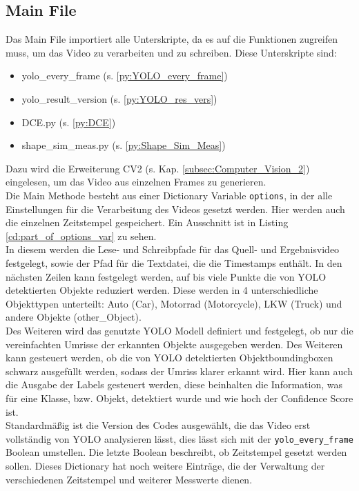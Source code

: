 \subsection{Main File}
{ 
	Das Main File importiert alle Unterskripte, da es auf die Funktionen zugreifen muss, um das Video zu verarbeiten und zu schreiben. Diese Unterskripte sind: 
	\begin{itemize}
		\item yolo\_every\_frame (s. \ref{py:YOLO_every_frame})
		\item yolo\_result\_version (s. \ref{py:YOLO_res_vers})
		\item DCE.py (s. \ref{py:DCE})
		\item shape\_sim\_meas.py (s. \ref{py:Shape_Sim_Meas})
	\end{itemize}
	Dazu wird die Erweiterung CV2 (s. Kap. \ref{subsec:Computer_Vision_2}) eingelesen, um das Video aus einzelnen Frames zu generieren.\\
	Die Main Methode besteht aus einer Dictionary Variable \lstinline|options|, in der alle Einstellungen für die Verarbeitung des Videos gesetzt werden. Hier werden auch die einzelnen Zeitstempel gespeichert. \ifimportant Ein Ausschnitt ist in Listing \ref{cd:part_of_options_var} zu sehen. \fi \\
	In diesem werden die Lese- und Schreibpfade für das Quell- und Ergebnisvideo festgelegt, sowie der Pfad für die Textdatei, die die Timestamps enthält. In den nächsten Zeilen kann festgelegt werden, auf bis viele Punkte die von YOLO detektierten Objekte reduziert werden. Diese werden in 4 unterschiedliche Objekttypen unterteilt: Auto (Car), Motorrad (Motorcycle), LKW (Truck) und andere Objekte (other\_Object). \\
	Des Weiteren wird das genutzte YOLO Modell definiert und festgelegt, ob nur die vereinfachten Umrisse der erkannten Objekte ausgegeben werden. Des Weiteren kann gesteuert werden, ob die von YOLO detektierten Objektboundingboxen schwarz ausgefüllt werden, sodass der Umriss klarer erkannt wird. Hier kann auch die Ausgabe der Labels gesteuert werden, diese beinhalten die Information, was für eine Klasse, bzw. Objekt, detektiert wurde und wie hoch der Confidence Score ist. \\
	Standardmäßig ist die Version des Codes ausgewählt, die das Video erst vollständig von YOLO analysieren lässt, dies lässt sich mit der \lstinline|yolo_every_frame| Boolean umstellen. Die letzte Boolean beschreibt, ob Zeitstempel gesetzt werden sollen. Dieses Dictionary hat noch weitere Einträge, die der Verwaltung der verschiedenen Zeitstempel und weiterer Messwerte dienen. \\
}
